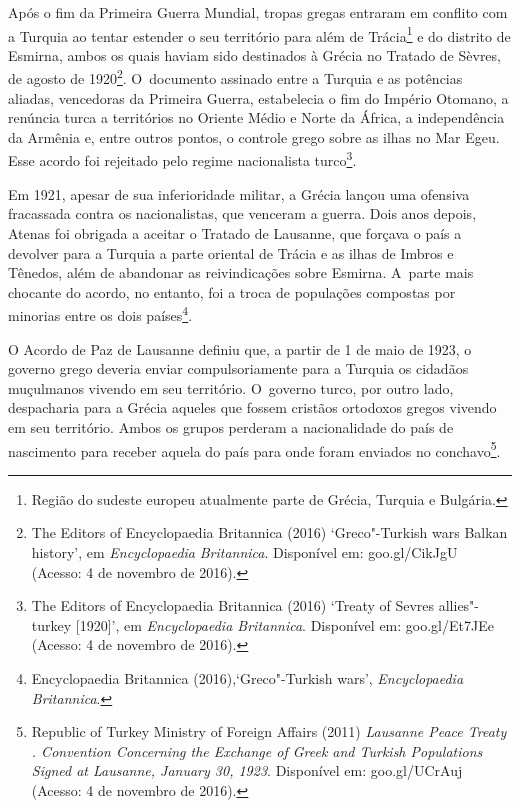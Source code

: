 Após o fim da Primeira Guerra Mundial, tropas gregas entraram em
conflito com a Turquia ao tentar estender o seu território para além
de Trácia\footnote{ Região do sudeste europeu atualmente parte de
Grécia, Turquia e Bulgária.}  e do distrito de Esmirna, ambos os quais
haviam sido destinados à Grécia no Tratado de Sèvres, de agosto de
1920\footnote{ The Editors of Encyclopaedia Britannica (2016)
`Greco"-Turkish wars \textbar{} Balkan history', em \emph{Encyclopaedia}
\emph{Britannica}. Disponível em:
goo.gl/CikJgU
(Acesso: 4 de
novembro de 2016).}. O~documento assinado entre a Turquia e as potências
aliadas, vencedoras da Primeira Guerra, estabelecia o fim do
Império Otomano, a renúncia turca a territórios no Oriente Médio e Norte
da África, a independência da Armênia e, entre outros pontos, o controle
grego sobre as ilhas no Mar Egeu. Esse acordo foi rejeitado pelo regime
nacionalista turco\footnote{ The Editors of Encyclopaedia Britannica (2016)
`Treaty of Sevres \textbar{} allies"-turkey {[}1920{]}', em
\emph{Encyclopaedia Britannica}. Disponível em:
goo.gl/Et7JEe
(Acesso: 4 de novembro
de 2016).}.

Em 1921, apesar de sua inferioridade militar, a Grécia lançou uma
ofensiva fracassada contra os nacionalistas, que venceram a guerra. Dois
anos depois, Atenas foi obrigada a aceitar o Tratado de Lausanne, que
forçava o país a devolver para a Turquia a parte oriental de Trácia e as
ilhas de Imbros e Tênedos, além de abandonar as reivindicações sobre
Esmirna. A~parte mais chocante do acordo, no entanto, foi a troca de
populações compostas por minorias entre os dois
países\footnote{ Encyclopaedia Britannica (2016),`Greco"-Turkish
wars', \emph{Encyclopaedia} \emph{Britannica}.}.

O Acordo de Paz de Lausanne definiu que, a partir de 1 de maio de 1923,
o governo grego deveria enviar compulsoriamente para a Turquia os
cidadãos muçulmanos vivendo em seu território. O~governo turco, por
outro lado, despacharia para a Grécia aqueles que fossem cristãos
ortodoxos gregos vivendo em seu território. Ambos os grupos perderam a
nacionalidade do país de nascimento para receber aquela do país para
onde foram enviados no conchavo\footnote{ Republic of Turkey Ministry of Foreign Affairs
(2011) \emph{Lausanne Peace Treaty . Convention Concerning the
Exchange of Greek and Turkish Populations Signed at Lausanne, January
30, 1923}. Disponível em:
goo.gl/UCrAuj
(Acesso: 4 de novembro de 2016).}.

